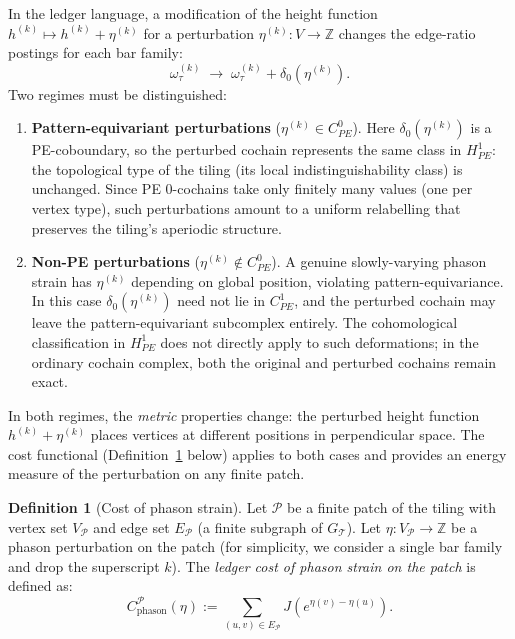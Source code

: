 \documentclass[12pt]{article}
\theoremstyle{definition}
\newtheorem{definition}[theorem]{Definition}
\theoremstyle{remark}
\newcommand{\ZZ}{\mathbb{Z}}
\begin{document}
In the ledger language, a modification of the height function $h^{(k)} \mapsto h^{(k)} + \eta^{(k)}$ for a perturbation $\eta^{(k)}: V \to \ZZ$ changes the edge-ratio postings for each bar family:
\begin{equation}
\omega_\tau^{(k)} \;\longrightarrow\; \omega_\tau^{(k)} + \delta_0(\eta^{(k)}).
\end{equation}
Two regimes must be distinguished:
\begin{enumerate}
\item[(a)] \textbf{Pattern-equivariant perturbations} ($\eta^{(k)} \in C^0_{PE}$). Here $\delta_0(\eta^{(k)})$ is a PE-coboundary, so the perturbed cochain represents the same class in $H^1_{PE}$: the topological type of the tiling (its local indistinguishability class) is unchanged. Since PE $0$-cochains take only finitely many values (one per vertex type), such perturbations amount to a uniform relabelling that preserves the tiling's aperiodic structure.
\item[(b)] \textbf{Non-PE perturbations} ($\eta^{(k)} \notin C^0_{PE}$). A genuine slowly-varying phason strain has $\eta^{(k)}$ depending on global position, violating pattern-equivariance. In this case $\delta_0(\eta^{(k)})$ need not lie in $C^1_{PE}$, and the perturbed cochain may leave the pattern-equivariant subcomplex entirely. The cohomological classification in $H^1_{PE}$ does not directly apply to such deformations; in the ordinary cochain complex, both the original and perturbed cochains remain exact.
\end{enumerate}
In both regimes, the \emph{metric} properties change: the perturbed height function $h^{(k)} + \eta^{(k)}$ places vertices at different positions in perpendicular space. The cost functional (Definition~\ref{def:phason-cost} below) applies to both cases and provides an energy measure of the perturbation on any finite patch.

\begin{definition}[Cost of phason strain]
\label{def:phason-cost}
Let $\mathcal{P}$ be a finite patch of the tiling with vertex set $V_{\mathcal{P}}$ and edge set $E_{\mathcal{P}}$ (a finite subgraph of $G_{\mathcal{T}}$). Let $\eta: V_{\mathcal{P}} \to \ZZ$ be a phason perturbation on the patch (for simplicity, we consider a single bar family and drop the superscript $k$). The \emph{ledger cost of phason strain on the patch} is defined as:
\begin{equation}
C^{\mathcal{P}}_{\text{phason}}(\eta) := \sum_{(u,v) \in E_{\mathcal{P}}} J\!\left(e^{\eta(v) - \eta(u)}\right).
\label{eq:phason-cost}
\end{equation}
\end{definition}
\end{document}
